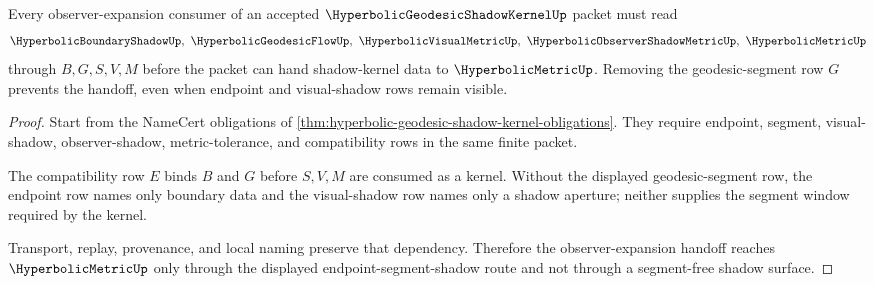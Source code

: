 \begin{theorem}
\label{thm:hyperbolic-geodesic-shadow-kernel-vision-handoff}
Every observer-expansion consumer of an accepted $\HyperbolicGeodesicShadowKernelUp$ packet must read
$$
\HyperbolicBoundaryShadowUp,\ \HyperbolicGeodesicFlowUp,\ \HyperbolicVisualMetricUp,\ \HyperbolicObserverShadowMetricUp,\ \HyperbolicMetricUp
$$
through $B,G,S,V,M$ before the packet can hand shadow-kernel data to $\HyperbolicMetricUp$. Removing the geodesic-segment row $G$ prevents the handoff, even when endpoint and visual-shadow rows remain visible.
\end{theorem}
\begin{proof}
Start from the NameCert obligations of \autoref{thm:hyperbolic-geodesic-shadow-kernel-obligations}. They require endpoint, segment, visual-shadow, observer-shadow, metric-tolerance, and compatibility rows in the same finite packet.

The compatibility row $E$ binds $B$ and $G$ before $S,V,M$ are consumed as a kernel. Without the displayed geodesic-segment row, the endpoint row names only boundary data and the visual-shadow row names only a shadow aperture; neither supplies the segment window required by the kernel.

Transport, replay, provenance, and local naming preserve that dependency. Therefore the observer-expansion handoff reaches $\HyperbolicMetricUp$ only through the displayed endpoint-segment-shadow route and not through a segment-free shadow surface.
\end{proof}



